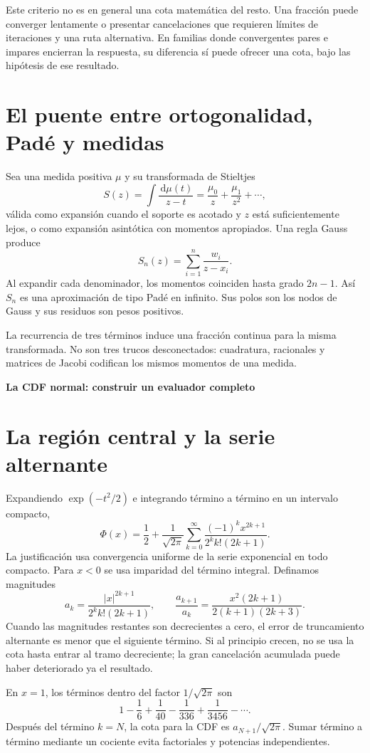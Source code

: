 \documentclass[11pt,a4paper]{article}
\newcommand{\dd}{\,\mathrm d}
\theoremstyle{definition}
\newcommand{\parte}[1]{\par\bigskip\Needspace{8\baselineskip}\begin{center}{\Large\bfseries\color{azul}#1}\end{center}}
\begin{document}
Este criterio no es en general una cota matemática del resto. Una fracción puede converger lentamente o presentar cancelaciones que requieren límites de iteraciones y una ruta alternativa. En familias donde convergentes pares e impares encierran la respuesta, su diferencia sí puede ofrecer una cota, bajo las hipótesis de ese resultado.

\section{El puente entre ortogonalidad, Padé y medidas}
Sea una medida positiva $\mu$ y su transformada de Stieltjes
\[
S(z)=\int\frac{\dd\mu(t)}{z-t}
=\frac{\mu_0}z+\frac{\mu_1}{z^2}+\cdots,
\]
válida como expansión cuando el soporte es acotado y $z$ está suficientemente lejos, o como expansión asintótica con momentos apropiados. Una regla Gauss produce
\[
S_n(z)=\sum_{i=1}^n\frac{w_i}{z-x_i}.
\]
Al expandir cada denominador, los momentos coinciden hasta grado $2n-1$. Así $S_n$ es una aproximación de tipo Padé en infinito. Sus polos son los nodos de Gauss y sus residuos son pesos positivos.

La recurrencia de tres términos induce una fracción continua para la misma transformada. No son tres trucos desconectados: cuadratura, racionales y matrices de Jacobi codifican los mismos momentos de una medida.



\parte{La CDF normal: construir un evaluador completo}
\section{La región central y la serie alternante}
Expandiendo $\exp(-t^2/2)$ e integrando término a término en un intervalo compacto,
\[
\Phi(x)=\frac12+\frac1{\sqrt{2\pi}}
\sum_{k=0}^\infty\frac{(-1)^kx^{2k+1}}{2^kk!(2k+1)}.
\]
La justificación usa convergencia uniforme de la serie exponencial en todo compacto. Para $x<0$ se usa imparidad del término integral. Definamos magnitudes
\[
a_k=\frac{|x|^{2k+1}}{2^kk!(2k+1)},\qquad
\frac{a_{k+1}}{a_k}
=\frac{x^2(2k+1)}{2(k+1)(2k+3)}.
\]
Cuando las magnitudes restantes son decrecientes a cero, el error de truncamiento alternante es menor que el siguiente término. Si al principio crecen, no se usa la cota hasta entrar al tramo decreciente; la gran cancelación acumulada puede haber deteriorado ya el resultado.

En $x=1$, los términos dentro del factor $1/\sqrt{2\pi}$ son
\[
1-\frac16+\frac1{40}-\frac1{336}+\frac1{3456}-\cdots.
\]
Después del término $k=N$, la cota para la CDF es $a_{N+1}/\sqrt{2\pi}$. Sumar término a término mediante un cociente evita factoriales y potencias independientes.
\end{document}
